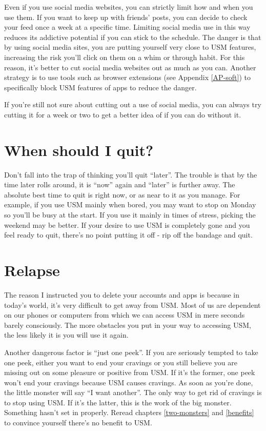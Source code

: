 \documentclass[
  openany]{book}
\begin{document}
Even if you use social media websites, you can strictly limit how and when you use them. If you want to keep up with friends' posts, you can decide to check your feed once a week at a specific time. Limiting social media use in this way reduces its addictive potential if you can stick to the schedule. The danger is that by using social media sites, you are putting yourself very close to USM features, increasing the risk you'll click on them on a whim or through habit. For this reason, it's better to cut social media websites out as much as you can. Another strategy is to use tools such as browser extensions (see Appendix \ref{AP-soft}) to specifically block USM features of apps to reduce the danger.

If you're still not sure about cutting out a use of social media, you can always try cutting it for a week or two to get a better idea of if you can do without it.

\section{When should I quit?}\label{when-should-i-quit}

Don't fall into the trap of thinking you'll quit ``later''. The trouble is that by the time later rolls around, it is ``now'' again and ``later'' is further away. The absolute best time to quit is right now, or as near to it as you manage. For example, if you use USM mainly when bored, you may want to stop on Monday so you'll be busy at the start. If you use it mainly in times of stress, picking the weekend may be better. If your desire to use USM is completely gone and you feel ready to quit, there's no point putting it off - rip off the bandage and quit.

\section{Relapse}\label{relapse}

The reason I instructed you to delete your accounts and apps is because in today's world, it's very difficult to get away from USM. Most of us are dependent on our phones or computers from which we can access USM in mere seconds barely consciously. The more obstacles you put in your way to accessing USM, the less likely it is you will use it again.

Another dangerous factor is ``just one peek''. If you are seriously tempted to take one peek, either you want to end your cravings or you still believe you are missing out on some pleasure or positive from USM. If it's the former, one peek won't end your cravings because USM causes cravings. As soon as you're done, the little monster will say ``I want another''. The only way to get rid of cravings is to stop using USM. If it's the latter, this is the work of the big monster. Something hasn't set in properly. Reread chapters \ref{two-monsters} and \ref{benefits} to convince yourself there's no benefit to USM.
\end{document}
